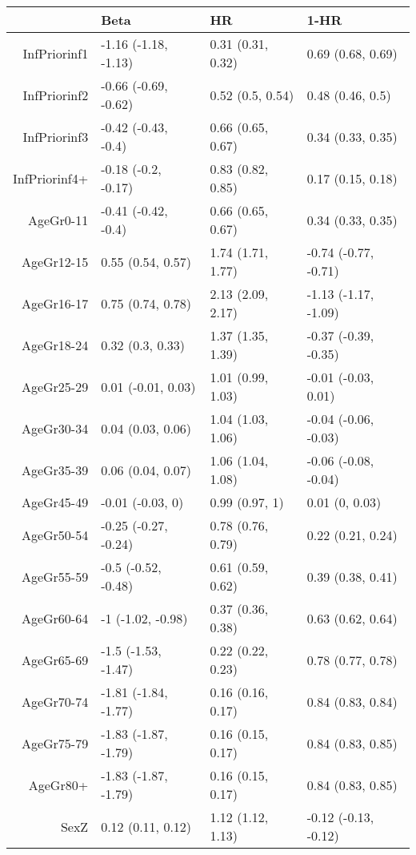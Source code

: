 \begin{table}[ht]
\centering
\begin{tabular}{rlll}
  \hline
 & Beta & HR & 1-HR \\ 
  \hline
InfPriorinf1 & -1.16 (-1.18, -1.13) & 0.31 (0.31, 0.32) & 0.69 (0.68, 0.69) \\ 
  InfPriorinf2 & -0.66 (-0.69, -0.62) & 0.52 (0.5, 0.54) & 0.48 (0.46, 0.5) \\ 
  InfPriorinf3 & -0.42 (-0.43, -0.4) & 0.66 (0.65, 0.67) & 0.34 (0.33, 0.35) \\ 
  InfPriorinf4+ & -0.18 (-0.2, -0.17) & 0.83 (0.82, 0.85) & 0.17 (0.15, 0.18) \\ 
  AgeGr0-11 & -0.41 (-0.42, -0.4) & 0.66 (0.65, 0.67) & 0.34 (0.33, 0.35) \\ 
  AgeGr12-15 & 0.55 (0.54, 0.57) & 1.74 (1.71, 1.77) & -0.74 (-0.77, -0.71) \\ 
  AgeGr16-17 & 0.75 (0.74, 0.78) & 2.13 (2.09, 2.17) & -1.13 (-1.17, -1.09) \\ 
  AgeGr18-24 & 0.32 (0.3, 0.33) & 1.37 (1.35, 1.39) & -0.37 (-0.39, -0.35) \\ 
  AgeGr25-29 & 0.01 (-0.01, 0.03) & 1.01 (0.99, 1.03) & -0.01 (-0.03, 0.01) \\ 
  AgeGr30-34 & 0.04 (0.03, 0.06) & 1.04 (1.03, 1.06) & -0.04 (-0.06, -0.03) \\ 
  AgeGr35-39 & 0.06 (0.04, 0.07) & 1.06 (1.04, 1.08) & -0.06 (-0.08, -0.04) \\ 
  AgeGr45-49 & -0.01 (-0.03, 0) & 0.99 (0.97, 1) & 0.01 (0, 0.03) \\ 
  AgeGr50-54 & -0.25 (-0.27, -0.24) & 0.78 (0.76, 0.79) & 0.22 (0.21, 0.24) \\ 
  AgeGr55-59 & -0.5 (-0.52, -0.48) & 0.61 (0.59, 0.62) & 0.39 (0.38, 0.41) \\ 
  AgeGr60-64 & -1 (-1.02, -0.98) & 0.37 (0.36, 0.38) & 0.63 (0.62, 0.64) \\ 
  AgeGr65-69 & -1.5 (-1.53, -1.47) & 0.22 (0.22, 0.23) & 0.78 (0.77, 0.78) \\ 
  AgeGr70-74 & -1.81 (-1.84, -1.77) & 0.16 (0.16, 0.17) & 0.84 (0.83, 0.84) \\ 
  AgeGr75-79 & -1.83 (-1.87, -1.79) & 0.16 (0.15, 0.17) & 0.84 (0.83, 0.85) \\ 
  AgeGr80+ & -1.83 (-1.87, -1.79) & 0.16 (0.15, 0.17) & 0.84 (0.83, 0.85) \\ 
  SexZ & 0.12 (0.11, 0.12) & 1.12 (1.12, 1.13) & -0.12 (-0.13, -0.12) \\ 
   \hline
\end{tabular}
\end{table}
